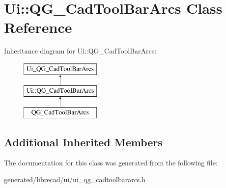 \hypertarget{classUi_1_1QG__CadToolBarArcs}{\section{Ui\-:\-:Q\-G\-\_\-\-Cad\-Tool\-Bar\-Arcs Class Reference}
\label{classUi_1_1QG__CadToolBarArcs}
}
Inheritance diagram for Ui\-:\-:Q\-G\-\_\-\-Cad\-Tool\-Bar\-Arcs\-:\begin{figure}[H]
\begin{center}
\leavevmode
\includegraphics[height=3.000000cm]{classUi_1_1QG__CadToolBarArcs}
\end{center}
\end{figure}
\subsection*{Additional Inherited Members}


The documentation for this class was generated from the following file\-:\begin{DoxyCompactItemize}
\item 
generated/librecad/ui/ui\-\_\-qg\-\_\-cadtoolbararcs.\-h\end{DoxyCompactItemize}
